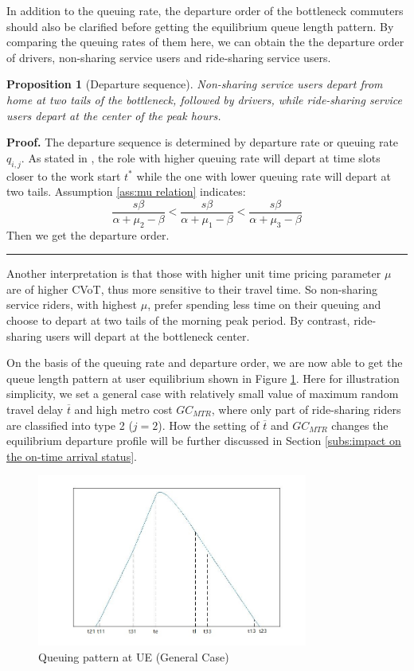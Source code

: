 \documentclass[a4paper,11pt]{article}
\newtheorem{proposition}[theorem]{Proposition}
\newenvironment{proof}[1][Proof]{\noindent\textbf{#1.} }{\ \rule{0.5em}{0.5em}}
\begin{document}
In addition to the queuing rate, the departure order of the bottleneck commuters should also be clarified before getting the equilibrium queue length pattern. By comparing the queuing rates of them here, we can obtain the the departure order of drivers, non-sharing service users and ride-sharing service users.

\begin{proposition}[Departure sequence] \label{pro:departure sequence}
Non-sharing service users depart from home at two tails of the bottleneck, followed by drivers, while ride-sharing service users depart at the center of the peak hours.
\end{proposition}

\begin{proof}
The departure sequence is determined by departure rate or queuing rate $q_{i,j}$. As stated in \cite{arnott1994welfare}, the role with higher queuing rate will depart at time slots closer to the work start $t^*$ while the one with lower queuing rate will depart at two tails. Assumption \ref{ass:mu relation} indicates:
\begin{equation*}
    \frac{s\beta}{\alpha+\mu_2-\beta}<\frac{s\beta}{\alpha+\mu_1-\beta}<\frac{s\beta}{\alpha+\mu_3-\beta}
\end{equation*}
Then we get the departure order.
\end{proof}

Another interpretation is that those with higher unit time pricing parameter $\mu$ are of higher CVoT, thus more sensitive to their travel time. So non-sharing service riders, with highest $\mu$, prefer spending less time on their queuing and choose to depart at two tails of the morning peak period. By contrast, ride-sharing users will depart at the bottleneck center. 

On the basis of the queuing rate and departure order, we are now able to get the queue length pattern at user equilibrium shown in Figure \ref{fig:general case}. Here for illustration simplicity, we set a general case with relatively small value of maximum random travel delay $\overline{t}$ and high metro cost $GC_{MTR}$, where only part of ride-sharing riders are classified into type 2 ($j=2$). How the setting of $\overline{t}$ and $GC_{MTR}$ changes the equilibrium departure profile will be further discussed in Section \ref{subs:impact on the on-time arrival status}. 

\begin{figure}
	\centering
	\includegraphics[width=3.5in]{image/case2.jpg}
	\caption{Queuing pattern at UE (General Case)}
	\label{fig:general case}
\end{figure}
\end{document}
